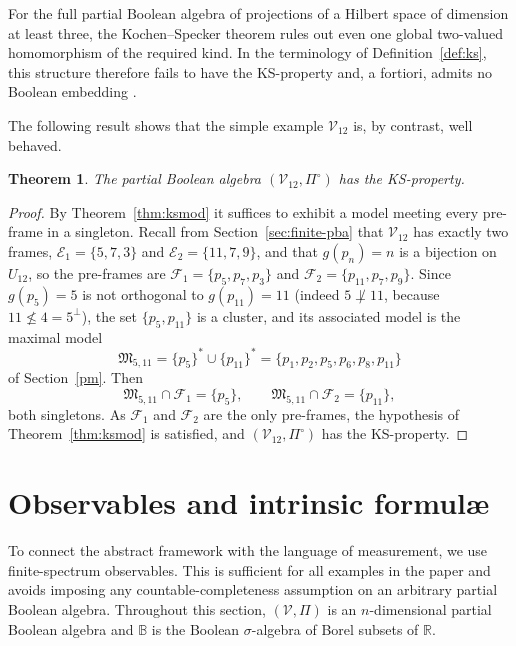 \documentclass{article}   	%
\theoremstyle{plain}
\newtheorem{theorem}{Theorem}[section]
\theoremstyle{definition}
\theoremstyle{remark}
\begin{document}
For the full partial Boolean algebra of projections of a Hilbert space of
dimension at least three, the Kochen--Specker theorem rules out even one global
two-valued homomorphism of the required kind.  In the terminology of
Definition~\ref{def:ks}, this structure therefore fails to have the KS-property
and, a fortiori, admits no Boolean embedding \cite{KS,Cabello2014}.

The following result shows that the simple example $\mathcal V_{12}$ is, by
contrast, well behaved.

\begin{theorem}
\label{thm:KS12}
The partial Boolean algebra $(\mathcal V_{12},\Pi^\circ)$ has the KS-property.
\end{theorem}

\begin{proof}
By Theorem~\ref{thm:ksmod} it suffices to exhibit a model meeting every pre-frame
in a singleton.
Recall from Section~\ref{sec:finite-pba} that $\mathcal V_{12}$ has exactly two frames,
$\mathcal E_1=\{5,7,3\}$ and $\mathcal E_2=\{11,7,9\}$, and that $g(p_n)=n$ is a
bijection on $U_{12}$, so the pre-frames are
$\mathcal F_1=\{p_5,p_7,p_3\}$ and $\mathcal F_2=\{p_{11},p_7,p_9\}$.
Since $g(p_5)=5$ is not orthogonal to $g(p_{11})=11$ (indeed $5\not\perp 11$,
because $11\not\le 4=5^\perp$), the set $\{p_5,p_{11}\}$ is a cluster, and its
associated model is the maximal model
\[
\mathfrak M_{5,11}=\{p_5\}^*\cup\{p_{11}\}^*
=\{p_1,p_2,p_5,p_6,p_8,p_{11}\}
\]
of Section~\ref{pm}.
Then
\[
\mathfrak M_{5,11}\cap\mathcal F_1=\{p_5\},
\qquad
\mathfrak M_{5,11}\cap\mathcal F_2=\{p_{11}\},
\]
both singletons.
As $\mathcal F_1$ and $\mathcal F_2$ are the only pre-frames, the hypothesis of
Theorem~\ref{thm:ksmod} is satisfied, and $(\mathcal V_{12},\Pi^\circ)$ has the
KS-property.
\end{proof}

\section{Observables and intrinsic formul\ae}
\label{sec:obs}

To connect the abstract framework with the language of measurement, we use
finite-spectrum observables.  This is sufficient for all examples in the paper
and avoids imposing any countable-completeness assumption on an arbitrary
partial Boolean algebra.  Throughout this section, $(\mathcal V,\Pi)$ is an
$n$-dimensional partial Boolean algebra and $\mathbb B$ is the Boolean
$\sigma$-algebra of Borel subsets of $\mathbb R$.
\end{document}
